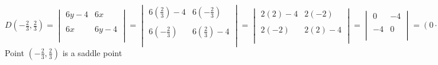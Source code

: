 \documentclass{article}
\begin{document}
\begin{enumerate}[14.]
	\\
	$D(-\frac{2}{3},\frac{2}{3})= \begin{vmatrix}
	6y-4&6x\\\\
	6x&6y-4\\\\
	\end{vmatrix}=\begin{vmatrix}
	6(\frac{2}{3})-4&6(-\frac{2}{3})\\\\
	6(-\frac{2}{3})&6(\frac{2}{3})-4\\\\
	\end{vmatrix}=\begin{vmatrix}
	2(2)-4&2(-2)\\\\
	2(-2)&2(2)-4\\\\
	\end{vmatrix}=\begin{vmatrix}
	0&-4\\\\
	-4&0\\\\
	\end{vmatrix}=(0\cdot0)-(-4\cdot-4)=0-16=-16$
	\\Point $(-\frac{2}{3},\frac{2}{3})$ is a saddle point\\
\end{enumerate}
\end{document}
